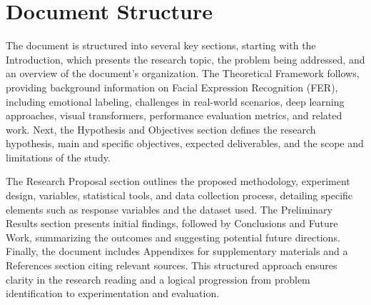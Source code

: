 \section{Document Structure}

The document is structured into several key sections, starting with the Introduction, which presents the research topic, the problem being addressed, and an overview of the document's organization. The Theoretical Framework follows, providing background information on Facial Expression Recognition (FER), including emotional labeling, challenges in real-world scenarios, deep learning approaches, visual transformers, performance evaluation metrics, and related work. Next, the Hypothesis and Objectives section defines the research hypothesis, main and specific objectives, expected deliverables, and the scope and limitations of the study. 

The Research Proposal section outlines the proposed methodology, experiment design, variables, statistical tools, and data collection process, detailing specific elements such as response variables and the dataset used. The Preliminary Results section presents initial findings, followed by Conclusions and Future Work, summarizing the outcomes and suggesting potential future directions. Finally, the document includes Appendixes for supplementary materials and a References section citing relevant sources. This structured approach ensures clarity in the research reading and a logical progression from problem identification to experimentation and evaluation.


